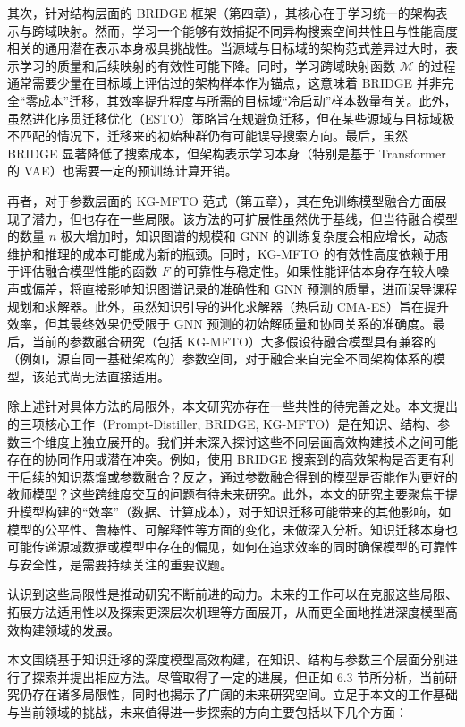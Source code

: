 \documentclass[../main.tex]{subfiles}
\begin{document}
其次，针对结构层面的 BRIDGE 框架（第四章），其核心在于学习统一的架构表示与跨域映射。然而，学习一个能够有效捕捉不同异构搜索空间共性且与性能高度相关的通用潜在表示本身极具挑战性。当源域与目标域的架构范式差异过大时，表示学习的质量和后续映射的有效性可能下降。同时，学习跨域映射函数 $\mathcal{M}$ 的过程通常需要少量在目标域上评估过的架构样本作为锚点，这意味着 BRIDGE 并非完全“零成本”迁移，其效率提升程度与所需的目标域“冷启动”样本数量有关。此外，虽然进化序贯迁移优化（ESTO）策略旨在规避负迁移，但在某些源域与目标域极不匹配的情况下，迁移来的初始种群仍有可能误导搜索方向。最后，虽然 BRIDGE 显著降低了搜索成本，但架构表示学习本身（特别是基于 Transformer 的 VAE）也需要一定的预训练计算开销。

再者，对于参数层面的 KG-MFTO 范式（第五章），其在免训练模型融合方面展现了潜力，但也存在一些局限。该方法的可扩展性虽然优于基线，但当待融合模型的数量 $n$ 极大增加时，知识图谱的规模和 GNN 的训练复杂度会相应增长，动态维护和推理的成本可能成为新的瓶颈。同时，KG-MFTO 的有效性高度依赖于用于评估融合模型性能的函数 $F$ 的可靠性与稳定性。如果性能评估本身存在较大噪声或偏差，将直接影响知识图谱记录的准确性和 GNN 预测的质量，进而误导课程规划和求解器。此外，虽然知识引导的进化求解器（热启动 CMA-ES）旨在提升效率，但其最终效果仍受限于 GNN 预测的初始解质量和协同关系的准确度。最后，当前的参数融合研究（包括 KG-MFTO）大多假设待融合模型具有兼容的（例如，源自同一基础架构的）参数空间，对于融合来自完全不同架构体系的模型，该范式尚无法直接适用。

除上述针对具体方法的局限外，本文研究亦存在一些共性的待完善之处。本文提出的三项核心工作（Prompt-Distiller, BRIDGE, KG-MFTO）是在知识、结构、参数三个维度上独立展开的。我们并未深入探讨这些不同层面高效构建技术之间可能存在的协同作用或潜在冲突。例如，使用 BRIDGE 搜索到的高效架构是否更有利于后续的知识蒸馏或参数融合？反之，通过参数融合得到的模型是否能作为更好的教师模型？这些跨维度交互的问题有待未来研究。此外，本文的研究主要聚焦于提升模型构建的“效率”（数据、计算成本），对于知识迁移可能带来的其他影响，如模型的公平性、鲁棒性、可解释性等方面的变化，未做深入分析。知识迁移本身也可能传递源域数据或模型中存在的偏见，如何在追求效率的同时确保模型的可靠性与安全性，是需要持续关注的重要议题。

认识到这些局限性是推动研究不断前进的动力。未来的工作可以在克服这些局限、拓展方法适用性以及探索更深层次机理等方面展开，从而更全面地推进深度模型高效构建领域的发展。


本文围绕基于知识迁移的深度模型高效构建，在知识、结构与参数三个层面分别进行了探索并提出相应方法。尽管取得了一定的进展，但正如 6.3 节所分析，当前研究仍存在诸多局限性，同时也揭示了广阔的未来研究空间。立足于本文的工作基础与当前领域的挑战，未来值得进一步探索的方向主要包括以下几个方面：
\end{document}
